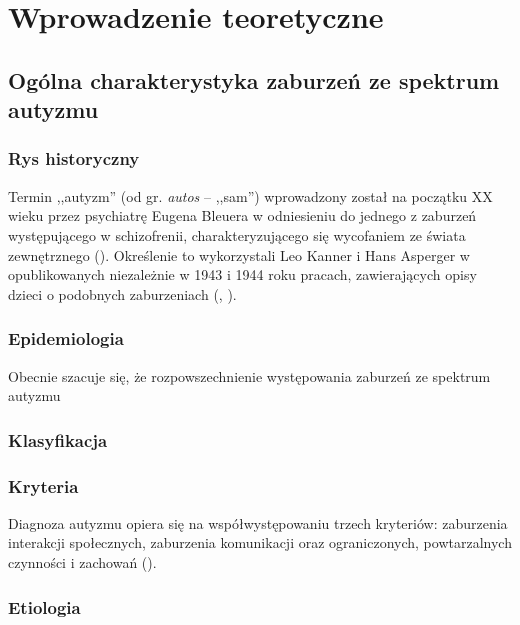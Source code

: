 \chapter{Wprowadzenie teoretyczne}
\thispagestyle{firststyle}

\section{Ogólna charakterystyka zaburzeń ze spektrum autyzmu}

    \subsection{Rys historyczny}
    Termin ,,autyzm'' (od gr. \emph{autos} -- ,,sam'') wprowadzony został na początku XX wieku przez psychiatrę Eugena Bleuera w odniesieniu do jednego z zaburzeń występującego w schizofrenii, charakteryzującego się wycofaniem ze świata zewnętrznego (\cite{frith2008autyzm}).
    Określenie to wykorzystali Leo Kanner i Hans Asperger w opublikowanych niezależnie w 1943 i 1944 roku pracach, zawierających opisy dzieci o podobnych zaburzeniach (\cite{kanner1943autistic}, \cite{asperger_1991}).
    
    \subsection{Epidemiologia}
    Obecnie szacuje się, że rozpowszechnienie występowania zaburzeń ze spektrum autyzmu
    
    \subsection{Klasyfikacja}
    
    \subsection{Kryteria}
    Diagnoza autyzmu opiera się na współwystępowaniu trzech kryteriów: zaburzenia interakcji społecznych, zaburzenia komunikacji oraz ograniczonych, powtarzalnych czynności i zachowań (\cite{frith2008autyzm}).
    
    \subsection{Etiologia}
    
